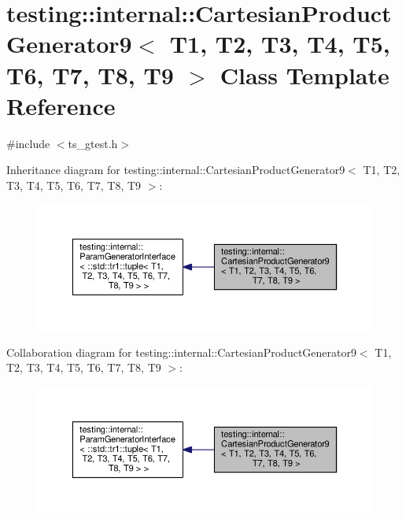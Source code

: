 \hypertarget{classtesting_1_1internal_1_1CartesianProductGenerator9}{\section{testing\-:\-:internal\-:\-:Cartesian\-Product\-Generator9$<$ T1, T2, T3, T4, T5, T6, T7, T8, T9 $>$ Class Template Reference}
\label{classtesting_1_1internal_1_1CartesianProductGenerator9}
}


{\ttfamily \#include $<$ts\-\_\-gtest.\-h$>$}



Inheritance diagram for testing\-:\-:internal\-:\-:Cartesian\-Product\-Generator9$<$ T1, T2, T3, T4, T5, T6, T7, T8, T9 $>$\-:\nopagebreak
\begin{figure}[H]
\begin{center}
\leavevmode
\includegraphics[width=350pt]{classtesting_1_1internal_1_1CartesianProductGenerator9__inherit__graph}
\end{center}
\end{figure}


Collaboration diagram for testing\-:\-:internal\-:\-:Cartesian\-Product\-Generator9$<$ T1, T2, T3, T4, T5, T6, T7, T8, T9 $>$\-:\nopagebreak
\begin{figure}[H]
\begin{center}
\leavevmode
\includegraphics[width=350pt]{classtesting_1_1internal_1_1CartesianProductGenerator9__coll__graph}
\end{center}
\end{figure}
